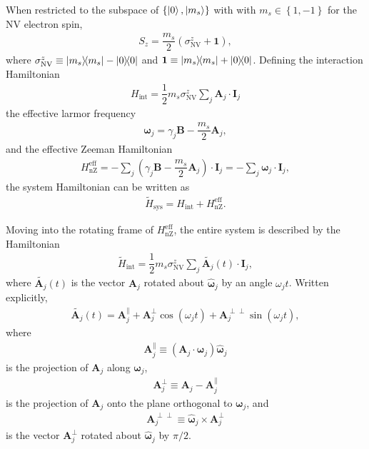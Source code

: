 \documentclass[twocolumn]{revtex4-1}
\renewcommand{\t}{\text} %
\newcommand{\f}[2]{\dfrac{#1}{#2}} %
\newcommand{\p}[1]{\left(#1\right)} %
\renewcommand{\set}[1]{\left\{#1\right\}} %
\renewcommand{\v}{\bm} %
\newcommand{\uv}[1]{\hat{\v{#1}}} %
\renewcommand{\c}{\cdot} %
\newcommand{\NV}{\t{NV}}
\begin{document}
When restricted to the subspace of $\set{\ket0,\ket{m_s}}$ with with
$m_s\in\set{1,-1}$ for the NV electron spin,
\begin{align}
  S_z = \f{m_s}2\p{\sigma_\NV^z+\mathbf1},
\end{align}
where $\sigma_\NV^z\equiv\op{m_s}-\op{0}$ and
$\mathbf1\equiv\op{m_s}+\op{0}$. Defining the interaction Hamiltonian
\begin{align}
  H_\t{int} = \f12m_s\sigma_\NV^z\sum_j\v A_j\c\v I_j
\end{align}
the effective larmor frequency
\begin{align}
  \v\omega_j = \gamma_j\v B - \f{m_s}2\v A_j,
\end{align}
and the effective Zeeman Hamiltonian
\begin{align}
  H_\t{nZ}^\t{eff} = -\sum_j\p{\gamma_j\v B - \f{m_s}2\v A_j}\c\v I_j
  = -\sum_j\v\omega_j\c\v I_j,
\end{align}
the system Hamiltonian can be written as
\begin{align}
  \tilde H_\t{sys} = H_\t{int} + H_\t{nZ}^\t{eff}.
  \label{S_H_sys_int_nZ}
\end{align}

Moving into the rotating frame of $H_\t{nZ}^\t{eff}$, the entire
system is described by the Hamiltonian
\begin{align}
  \tilde H_\t{int} = \f12m_s\sigma_\NV^z
  \sum_j\tilde{\v A_j}\p{t}\c\v I_j,
  \label{S_H_int_no_DD}
\end{align}
where $\tilde{\v A_j}\p{t}$ is the vector $\v A_j$ rotated about
$\uv\omega_j$ by an angle $\omega_jt$. Written explicitly,
\begin{align}
  \tilde{\v A_j}\p{t} = \v A_j^\parallel + \v A_j^\perp\cos\p{\omega_jt}
  + \v A_j^{\perp\perp}\sin\p{\omega_jt},
  \label{S_A_rot}
\end{align}
where
\begin{align}
  \v A_j^\parallel\equiv\p{\v A_j\c\uv\omega_j}\uv\omega_j
\end{align}
is the projection of $\v A_j$ along $\v \omega_j$,
\begin{align}
  \v A_j^\perp\equiv\v A_j-\v A_j^\parallel
\end{align}
is the projection of $\v A_j$ onto the plane orthogonal to
$\v\omega_j$, and
\begin{align}
  \v A_j^{\perp\perp}\equiv\uv\omega_j\times\v A_j^\perp
\end{align}
is the vector $\v A_j^\perp$ rotated about $\uv\omega_j$ by $\pi/2$.
\end{document}
